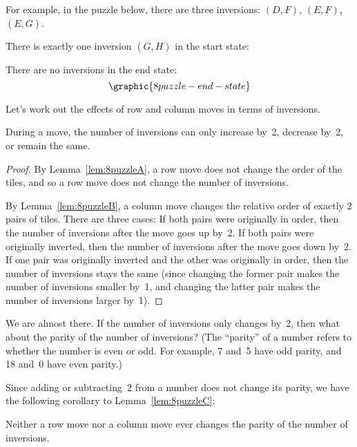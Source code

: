 For example, in the puzzle below, there are three inversions: $(D,
F)$, $(E, F)$, $(E, G)$.
\begin{figure}[h]
\end{figure}

There is exactly one inversion $(G, H)$ in the start state:
\begin{figure}[h]
\end{figure}

There are no inversions in the end state:
\begin{equation*}
\graphic{8puzzle-end-state}
\end{equation*}

Let's work out the effects of row and column moves in terms of
inversions.

\begin{lemma}\label{lem:8puzzleC}
During a move, the number of inversions can only increase by~2,
decrease by~2, or remain the same.
\end{lemma}

\begin{proof}
By Lemma~\ref{lem:8puzzleA}, a row move does not change the order of
the tiles, and so a row move does not change the number
of inversions.

By Lemma~\ref{lem:8puzzleB}, a column move changes the relative order
of exactly 2 pairs of tiles.  There are three cases: If both pairs
were originally in order, then the number of inversions after the move
goes up by~2.  If both pairs were originally inverted, then the number
of inversions after the move goes down by~2.  If one pair was
originally inverted and the other was originally in order, then the
number of inversions stays the same (since changing the former pair
makes the number of inversions smaller by~1, and changing the latter
pair makes the number of inversions larger by~1).
\end{proof}

We are almost there.  If the number of inversions only changes by~2,
then what about the parity of the number of inversions?  (The
``parity'' of a number refers to whether the number is even or odd.
For example, 7 and~5 have odd parity, and 18 and~0 have even parity.)

Since adding or subtracting~2 from a number does not change its
parity, we have the following corollary to Lemma~\ref{lem:8puzzleC}:
\begin{corollary}\label{cor:8puzzleparity}
Neither a row move nor a column move ever changes the parity of the number
of inversions.
\end{corollary}

